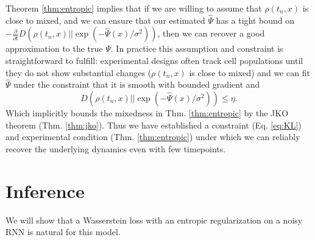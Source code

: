 \documentclass{article}
\begin{document}
Theorem \ref{thm:entropic} implies that if we are willing to assume that $\rho(t_n,x)$ is close to mixed, and we can ensure that our estimated $\hat{\Psi}$ has a tight bound on $-\frac{\partial }{\partial t}D(\rho(t_n,x)||\exp(-\hat{\Psi}(x)/\sigma^2))$, then we can recover a good approximation to the true $\Psi$. In practice this assumption and constraint is straightforward to fulfill: experimental designs often track cell populations until they do not show substantial changes ($\rho(t_n,x)$ is close to mixed) and we can fit $\hat{\Psi}$ under the constraint that it is smooth with bounded gradient and
\begin{equation}\label{eq:KL}
D(\rho(t_n,x)||\exp(-\hat{\Psi}(x)/\sigma^2)) \leq \eta.
\end{equation}
Which implicitly bounds the mixedness in Thm. \ref{thm:entropic} by the JKO theorem (Thm. \ref{thm:jko}). Thus we have established a constraint (Eq. \ref{eq:KL}) and experimental condition (Thm. \ref{thm:entropic}) under which we can reliably recover the underlying dynamics even with few timepoints.



\section{Inference}
We will show that a Wasserstein loss with an entropic regularization on a noisy RNN is natural for this model.
\end{document}
